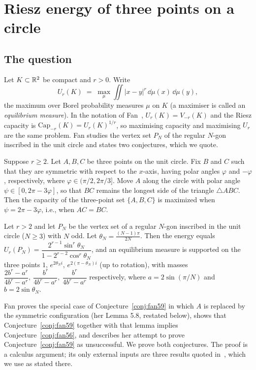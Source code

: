 \section{Riesz energy of three points on a circle}\label{sec:riesz}

\subsection{The question}
Let $K\subset\mathbb{R}^2$ be compact and $r>0$. Write
\[
U_r(K)\;=\;\max_{\mu}\iint |x-y|^{r}\,\dd\mu(x)\,\dd\mu(y),
\]
the maximum over Borel probability measures $\mu$ on $K$ (a maximiser is called an \emph{equilibrium measure}). In the notation of Fan~\cite{Fan}, $U_r(K)=V_{-r}(K)$ and the Riesz capacity is $\mathrm{Cap}_{-r}(K)=U_r(K)^{1/r}$, so maximising capacity and maximising $U_r$ are the same problem. Fan studies the vertex set $P_N$ of the regular $N$-gon inscribed in the unit circle and states two conjectures, which we quote.

\begin{conjecture}\label{conj:fan59}
Suppose $r\ge2$. Let $A,B,C$ be three points on the unit circle. Fix $B$ and $C$ such that they are symmetric with respect to the $x$-axis, having polar angles $\varphi$ and $-\varphi$, respectively, where $\varphi\in(\pi/2,2\pi/3]$. Move $A$ along the circle with polar angle $\psi\in[0,2\pi-3\varphi]$, so that $BC$ remains the longest side of the triangle $\triangle ABC$. Then the capacity of the three-point set $\{A,B,C\}$ is maximized when $\psi=2\pi-3\varphi$, i.e., when $AC=BC$.
\end{conjecture}

\begin{conjecture}\label{conj:fan56}
Let $r>2$ and let $P_N$ be the vertex set of a regular $N$-gon inscribed in the unit circle ($N\ge3$) with $N$ odd. Let $\theta_N=\frac{(N-1)\pi}{2N}$. Then the energy equals $U_r(P_N)=\dfrac{2^{r-1}\sin^r\theta_N}{1-2^{r-2}\cos^r\theta_N}$, and an equilibrium measure is supported on the three points $1$, $e^{2\theta_N i}$, $e^{2(\pi-\theta_N)i}$ (up to rotation), with masses $\dfrac{2b^r-a^r}{4b^r-a^r},\ \dfrac{b^r}{4b^r-a^r},\ \dfrac{b^r}{4b^r-a^r}$ respectively, where $a=2\sin(\pi/N)$ and $b=2\sin\theta_N$.
\end{conjecture}

Fan proves the special case of Conjecture~\ref{conj:fan59} in which $A$ is replaced by the symmetric configuration (her Lemma 5.8, restated below), shows that Conjecture~\ref{conj:fan59} together with that lemma implies Conjecture~\ref{conj:fan56}, and describes her attempt to prove Conjecture~\ref{conj:fan59} as unsuccessful. We prove both conjectures. The proof is a calculus argument; its only external inputs are three results quoted in~\cite{Fan}, which we use as stated there.


